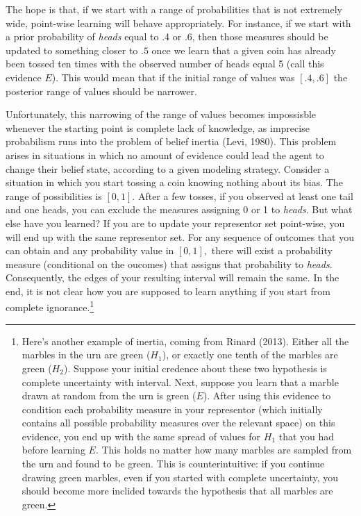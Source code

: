 \documentclass[
  letterpaper,
  DIV=11,
  numbers=noendperiod]{scrartcl}
\begin{document}
\noindent The hope is that, if we start with a range of probabilities
that is not extremely wide, point-wise learning will behave
appropriately. For instance, if we start with a prior probability of
\emph{heads} equal to .4 or .6, then those measures should be updated to
something closer to \(.5\) once we learn that a given coin has already
been tossed ten times with the observed number of heads equal 5 (call
this evidence \(E\)). This would mean that if the initial range of
values was \([.4,.6]\) the posterior range of values should be narrower.

Unfortunately, this narrowing of the range of values becomes impossisble
whenever the starting point is complete lack of knowledge, as imprecise
probabilism runs into the problem of belief inertia (Levi, 1980). This
problem arises in situations in which no amount of evidence could lead
the agent to change their belief state, according to a given modeling
strategy. Consider a situation in which you start tossing a coin knowing
nothing about its bias. The range of possibilities is \([0,1]\). After a
few tosses, if you observed at least one tail and one heads, you can
exclude the measures assigning 0 or 1 to \emph{heads}. But what else
have you learned? If you are to update your representor set point-wise,
you will end up with the same representor set. For any sequence of
outcomes that you can obtain and any probability value in \([0, 1],\)
there will exist a probability measure (conditional on the oucomes) that
assigns that probability to \emph{heads}. Consequently, the edges of
your resulting interval will remain the same. In the end, it is not
clear how you are supposed to learn anything if you start from complete
ignorance.\footnote{Here's another example of inertia, coming from
  Rinard (2013). Either all the marbles in the urn are green (\(H_1\)),
  or exactly one tenth of the marbles are green (\(H_2\)). Suppose your
  initial credence about these two hypothesis is complete uncertainty
  with interval. Next, suppose you learn that a marble drawn at random
  from the urn is green (\(E\)). After using this evidence to condition
  each probability measure in your representor (which initially contains
  all possible probability measures over the relevant space) on this
  evidence, you end up with the same spread of values for \(H_1\) that
  you had before learning \(E\). This holds no matter how many marbles
  are sampled from the urn and found to be green. This is
  counterintuitive: if you continue drawing green marbles, even if you
  started with complete uncertainty, you should become more inclided
  towards the hypothesis that all marbles are green.}
\end{document}
